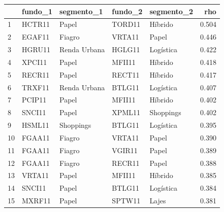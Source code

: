\begin{tabular}{lllllr}
\toprule
 & fundo\_1 & segmento\_1 & fundo\_2 & segmento\_2 & rho \\
\midrule
1 & HCTR11 & Papel & TORD11 & Híbrido & 0.504 \\
2 & EGAF11 & Fiagro & VRTA11 & Papel & 0.446 \\
3 & HGRU11 & Renda Urbana & HGLG11 & Logística & 0.422 \\
4 & XPCI11 & Papel & MFII11 & Híbrido & 0.418 \\
5 & RECR11 & Papel & RECT11 & Híbrido & 0.417 \\
6 & TRXF11 & Renda Urbana & BTLG11 & Logística & 0.407 \\
7 & PCIP11 & Papel & MFII11 & Híbrido & 0.402 \\
8 & SNCI11 & Papel & XPML11 & Shoppings & 0.402 \\
9 & HSML11 & Shoppings & BTLG11 & Logística & 0.395 \\
10 & FGAA11 & Fiagro & VRTA11 & Papel & 0.390 \\
11 & FGAA11 & Fiagro & VGIR11 & Papel & 0.389 \\
12 & FGAA11 & Fiagro & RECR11 & Papel & 0.388 \\
13 & VRTA11 & Papel & MFII11 & Híbrido & 0.385 \\
14 & SNCI11 & Papel & BTLG11 & Logística & 0.384 \\
15 & MXRF11 & Papel & SPTW11 & Lajes & 0.381 \\
\bottomrule
\end{tabular}
